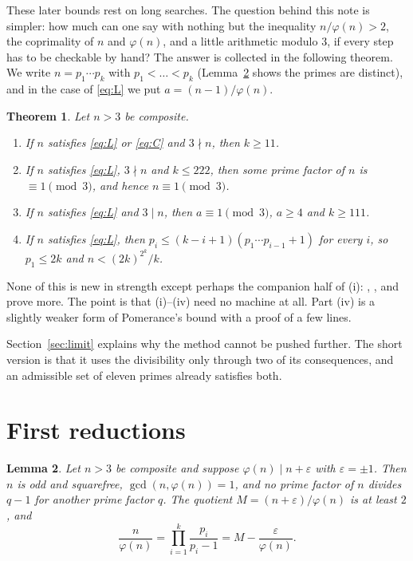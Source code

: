 \documentclass[11pt]{amsart}
\newtheorem{theorem}{Theorem}
\newtheorem{lemma}[theorem]{Lemma}
\theoremstyle{definition}
\theoremstyle{remark}
\begin{document}
These later bounds rest on long searches. The question behind this
note is simpler: how much can one say with nothing but the inequality
$n/\varphi(n)>2$, the coprimality of $n$ and $\varphi(n)$, and a little
arithmetic modulo $3$, if every step has to be checkable by hand? The
answer is collected in the following theorem. We write $n=p_1\cdots p_k$
with $p_1<\dots<p_k$ (Lemma~\ref{lem:basic} shows the primes are
distinct), and in the case of \eqref{eq:L} we put $a=(n-1)/\varphi(n)$.

\begin{theorem}\label{thm:main}
Let $n>3$ be composite.
\begin{enumerate}
\item[(i)] If $n$ satisfies \eqref{eq:L} or \eqref{eq:C} and $3\nmid n$,
then $k\ge11$.
\item[(ii)] If $n$ satisfies \eqref{eq:L}, $3\nmid n$ and $k\le222$, then
some prime factor of $n$ is $\equiv1\pmod3$, and hence $n\equiv1\pmod3$.
\item[(iii)] If $n$ satisfies \eqref{eq:L} and $3\mid n$, then
$a\equiv1\pmod3$, $a\ge4$ and $k\ge111$.
\item[(iv)] If $n$ satisfies \eqref{eq:L}, then $p_i\le(k-i+1)(p_1\cdots
p_{i-1}+1)$ for every $i$, so $p_1\le2k$ and $n<(2k)^{2^{k}}/k$.
\end{enumerate}
\end{theorem}

None of this is new in strength except perhaps the companion half of (i):
\cite{CH80}, \cite{Hag88}, \cite{Pom77} and \cite{MBB} prove more. The
point is that (i)--(iv) need no machine at all. Part (iv) is a slightly
weaker form of Pomerance's bound with a proof of a few lines.

Section~\ref{sec:limit} explains why the method cannot be pushed further.
The short version is that it uses the divisibility only through two of
its consequences, and an admissible set of eleven primes already
satisfies both.

\section{First reductions}

\begin{lemma}\label{lem:basic}
Let $n>3$ be composite and suppose $\varphi(n)\mid n+\varepsilon$ with
$\varepsilon=\pm1$. Then $n$ is odd and squarefree, $\gcd(n,\varphi(n))=1$,
and no prime factor of $n$ divides $q-1$ for another prime factor $q$.
The quotient $M=(n+\varepsilon)/\varphi(n)$ is at least $2$, and
\begin{equation}\label{eq:ratio}
  \frac{n}{\varphi(n)}=\prod_{i=1}^{k}\frac{p_i}{p_i-1}=M-\frac{\varepsilon}{\varphi(n)} .
\end{equation}
\end{lemma}
\end{document}
